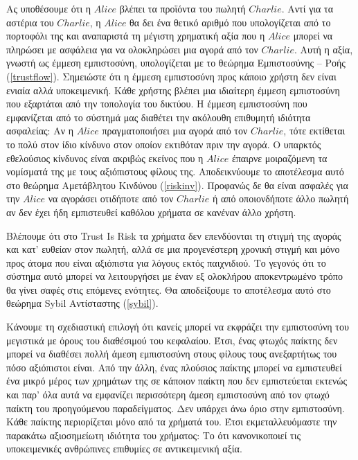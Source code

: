   Ας υποθέσουμε ότι η $Alice$ βλέπει τα προϊόντα του πωλητή $Charlie$. Αντί για τα αστέρια του $Charlie$, η $Alice$ θα δει ένα
  θετικό αριθμό που υπολογίζεται από το πορτοφόλι της και αναπαριστά τη μέγιστη χρηματική αξία που η $Alice$ μπορεί να
  πληρώσει με ασφάλεια για να ολοκληρώσει μια αγορά από τον $Charlie$. Αυτή η αξία, γνωστή ως έμμεση εμπιστοσύνη, υπολογίζεται
  με το θεώρημα Εμπιστοσύνης -- Ροής (\ref{trustflow}). Σημειώστε ότι η έμμεση εμπιστοσύνη προς κάποιο χρήστη δεν είναι ενιαία
  αλλά υποκειμενική. Κάθε χρήστης βλέπει μια ιδιαίτερη έμμεση εμπιστοσύνη που εξαρτάται από την τοπολογία του δικτύου. Η
  έμμεση εμπιστοσύνη που εμφανίζεται από το σύστημά μας διαθέτει την ακόλουθη επιθυμητή ιδιότητα ασφαλείας: Αν η $Alice$
  πραγματοποιήσει μια αγορά από τον $Charlie$, τότε εκτίθεται το πολύ στον ίδιο κίνδυνο στον οποίον εκτιθόταν πριν την αγορά.
  Ο υπαρκτός εθελούσιος κίνδυνος είναι ακριβώς εκείνος που η $Alice$ έπαιρνε μοιραζόμενη τα νομίσματά της με τους αξιόπιστους
  φίλους της. Αποδεικνύουμε το αποτέλεσμα αυτό στο θεώρημα Αμετάβλητου Κινδύνου (\ref{riskinv}). Προφανώς δε θα είναι ασφαλές
  για την $Alice$ να αγοράσει οτιδήποτε από τον $Charlie$ ή από οποιονδήποτε άλλο πωλητή αν δεν έχει ήδη εμπιστευθεί καθόλου
  χρήματα σε κανέναν άλλο χρήστη.

  Βλέπουμε ότι στο \textlatin{Trust Is Risk} τα χρήματα δεν επενδύονται τη στιγμή της αγοράς και κατ' ευθείαν στον πωλητή,
  αλλά σε μια προγενέστερη χρονική στιγμή και μόνο προς άτομα που είναι αξιόπιστα για λόγους εκτός παιχνιδιού. Το γεγονός ότι
  το σύστημα αυτό μπορεί να λειτουργήσει με έναν εξ ολοκλήρου αποκεντρωμένο τρόπο θα γίνει σαφές στις επόμενες ενότητες. Θα
  αποδείξουμε το αποτέλεσμα αυτό στο θεώρημα \textlatin{Sybil} Αντίσταστης (\ref{sybil}).

  Κάνουμε τη σχεδιαστική επιλογή ότι κανείς μπορεί να εκφράζει την εμπιστοσύνη του μεγιστικά με όρους του διαθέσιμού του
  κεφαλαίου. Έτσι, ένας φτωχός παίκτης δεν μπορεί να διαθέσει πολλή άμεση εμπιστοσύνη στους φίλους τους ανεξαρτήτως του πόσο
  αξιόπιστοι είναι. Από την άλλη, ένας πλούσιος παίκτης μπορεί να εμπιστευθεί ένα μικρό μέρος των χρημάτων της σε κάποιον
  παίκτη που δεν εμπιστεύεται εκτενώς και παρ' όλα αυτά να εμφανίζει περισσότερη άμεση εμπιστοσύνη από τον φτωχό παίκτη του
  προηγούμενου παραδείγματος. Δεν υπάρχει άνω όριο στην εμπιστοσύνη. Κάθε παίκτης περιορίζεται μόνο από τα χρήματά του. Έτσι
  εκμεταλλευόμαστε την παρακάτω αξιοσημείωτη ιδιότητα του χρήματος: Το ότι κανονικοποιεί τις υποκειμενικές ανθρώπινες
  επιθυμίες σε αντικειμενική αξία.

